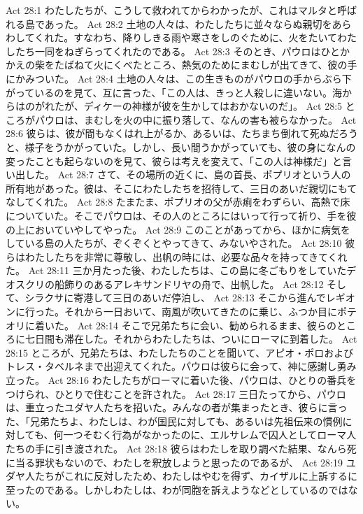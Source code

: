 Act 28:1  わたしたちが、こうして救われてからわかったが、これはマルタと呼ばれる島であった。
Act 28:2  土地の人々は、わたしたちに並々ならぬ親切をあらわしてくれた。すなわち、降りしきる雨や寒さをしのぐために、火をたいてわたしたち一同をねぎらってくれたのである。
Act 28:3  そのとき、パウロはひとかかえの柴をたばねて火にくべたところ、熱気のためにまむしが出てきて、彼の手にかみついた。
Act 28:4  土地の人々は、この生きものがパウロの手からぶら下がっているのを見て、互に言った、「この人は、きっと人殺しに違いない。海からはのがれたが、ディケーの神様が彼を生かしてはおかないのだ」。
Act 28:5  ところがパウロは、まむしを火の中に振り落して、なんの害も被らなかった。
Act 28:6  彼らは、彼が間もなくはれ上がるか、あるいは、たちまち倒れて死ぬだろうと、様子をうかがっていた。しかし、長い間うかがっていても、彼の身になんの変ったことも起らないのを見て、彼らは考えを変えて、「この人は神様だ」と言い出した。
Act 28:7  さて、その場所の近くに、島の首長、ポプリオという人の所有地があった。彼は、そこにわたしたちを招待して、三日のあいだ親切にもてなしてくれた。
Act 28:8  たまたま、ポプリオの父が赤痢をわずらい、高熱で床についていた。そこでパウロは、その人のところにはいって行って祈り、手を彼の上においていやしてやった。
Act 28:9  このことがあってから、ほかに病気をしている島の人たちが、ぞくぞくとやってきて、みないやされた。
Act 28:10  彼らはわたしたちを非常に尊敬し、出帆の時には、必要な品々を持ってきてくれた。
Act 28:11  三か月たった後、わたしたちは、この島に冬ごもりをしていたデオスクリの船飾りのあるアレキサンドリヤの舟で、出帆した。
Act 28:12  そして、シラクサに寄港して三日のあいだ停泊し、
Act 28:13  そこから進んでレギオンに行った。それから一日おいて、南風が吹いてきたのに乗じ、ふつか目にポテオリに着いた。
Act 28:14  そこで兄弟たちに会い、勧められるまま、彼らのところに七日間も滞在した。それからわたしたちは、ついにローマに到着した。
Act 28:15  ところが、兄弟たちは、わたしたちのことを聞いて、アピオ・ポロおよびトレス・タベルネまで出迎えてくれた。パウロは彼らに会って、神に感謝し勇み立った。
Act 28:16  わたしたちがローマに着いた後、パウロは、ひとりの番兵をつけられ、ひとりで住むことを許された。
Act 28:17  三日たってから、パウロは、重立ったユダヤ人たちを招いた。みんなの者が集まったとき、彼らに言った、「兄弟たちよ、わたしは、わが国民に対しても、あるいは先祖伝来の慣例に対しても、何一つそむく行為がなかったのに、エルサレムで囚人としてローマ人たちの手に引き渡された。
Act 28:18  彼らはわたしを取り調べた結果、なんら死に当る罪状もないので、わたしを釈放しようと思ったのであるが、
Act 28:19  ユダヤ人たちがこれに反対したため、わたしはやむを得ず、カイザルに上訴するに至ったのである。しかしわたしは、わが同胞を訴えようなどとしているのではない。
